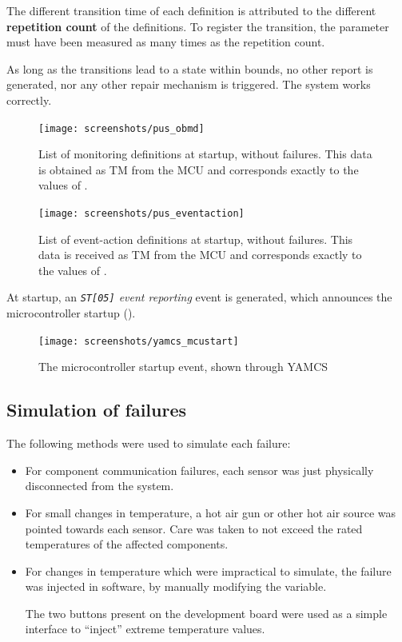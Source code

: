 \documentclass[a4paper,nobib]{tufte-book}
\begin{document}
The different transition time of each definition is attributed to the different \textbf{repetition count} of the definitions. To register the transition, the parameter must have been measured as many times as the repetition count.

As long as the transitions lead to a state within bounds, no other report is generated, nor any other repair mechanism is triggered. The system works correctly.

\begin{figure}[h]
	\texttt{[image: screenshots/pus\_obmd]}
	\caption[List of monitoring definitions at startup, without failures]{List of monitoring definitions at startup, without failures. This data is obtained as \acs{TM} from the \acs{MCU} and corresponds exactly to the values of .}
		\label{fig:pus_obmd}
\end{figure}
	
\begin{figure}[h]
	\texttt{[image: screenshots/pus\_eventaction]}
	\caption[List of event-action definitions]{List of event-action definitions at startup, without failures. This data is received as \acs{TM} from the \acs{MCU} and corresponds exactly to the values of .}
		\label{fig:pus_eventaction}
\end{figure}
		
At startup, an \emph{\texttt{ST[05]} event reporting} event is generated, which announces the microcontroller startup ().
			
\begin{figure}[h]
	\centering
	\caption{The microcontroller startup event, shown through \acs{YAMCS}}
	\label{fig:yamcsmcustart}
	\texttt{[image: screenshots/yamcs\_mcustart]}
\end{figure}

\FloatBarrier
\subsection{Simulation of failures}
\label{sec:simul}

The following methods were used to simulate each failure:
\begin{itemize}
	\item For component communication failures, each sensor was just physically disconnected from the system.
	\item For small changes in temperature, a hot air gun or other hot air source was pointed towards each sensor. Care was taken to not exceed the rated temperatures of the affected components.
	\item For changes in temperature which were impractical to simulate, the failure was injected in software, by manually modifying the variable.
	
	The two buttons present on the development board were used as a simple interface to ``inject'' extreme temperature values.
\end{itemize}
\end{document}
